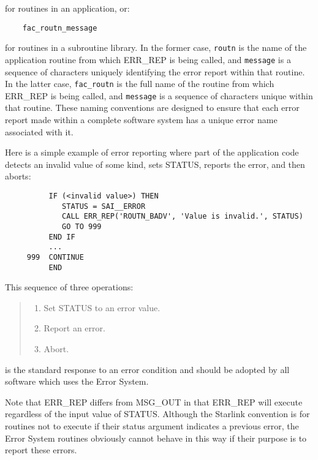 for routines in an application, or:

\begin{small}
\begin{verbatim}
    fac_routn_message
\end{verbatim}
\end{small}

for routines in a subroutine library.
In the former case, {\tt routn} is the name of the application routine from
which ERR\_REP is being called, and {\tt message} is a sequence of characters
uniquely identifying the error report within that routine.
In the latter case, {\tt fac\_routn} is the full name of the routine from
which ERR\_REP is being called, and {\tt message} is a sequence of characters
unique within that routine.
These naming conventions are designed to ensure that each error report made
within a complete software system has a unique error name associated with it.

Here is a simple example of error reporting where part of the application code
detects an invalid value of some kind, sets STATUS, reports the error, and then
aborts:

\begin{small}
\begin{verbatim}
          IF (<invalid value>) THEN
             STATUS = SAI__ERROR
             CALL ERR_REP('ROUTN_BADV', 'Value is invalid.', STATUS)
             GO TO 999
          END IF
          ...
     999  CONTINUE
          END
\end{verbatim}
\end{small}

This sequence of three operations:
\begin {quote}
\begin {enumerate}
\item Set STATUS to an error value.
\item Report an error.
\item Abort.
\end {enumerate}
\end {quote}
is the standard response to an error condition and should be adopted by all
software which uses the Error System.

Note that ERR\_REP differs from MSG\_OUT in that ERR\_REP will execute
regardless of the input value of STATUS.
Although the Starlink convention is for routines not to execute if their
status argument indicates a previous error, the Error System routines
obviously cannot behave in this way if their purpose is to report these errors.

